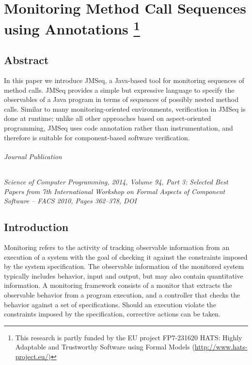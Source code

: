 
\chapter[Monitoring Method Call Sequences using Annotations]{Monitoring Method Call Sequences using Annotations%
\footnote{This research is partly funded by the EU project FP7-231620 HATS: Highly Adaptable and Trustworthy Software using Formal Models (\url{http://www.hats-project.eu/})}
}
% 
\label{ch:p03:ch02}
% 
% 

\section*{Abstract}
In this paper we introduce JMSeq, a Java-based tool for 
monitoring  sequences of
method calls. JMSeq provides a simple but expressive language
to specify the observables of  a Java program in terms of sequences of possibly nested method calls. 
Similar to many
monitoring-oriented environments, verification in JMSeq is done
at runtime; unlike all other approaches based on
aspect-oriented programming, JMSeq uses code
annotation rather than instrumentation,
and therefore is suitable for component-based software verification.

\subparagraph*{Journal Publication}
\emph{Science of Computer Programming, 2014, Volume 94, Part 3: Selected Best Papers from 7th International Workshop on Formal Aspects of Component Software -- FACS 2010, Pages 362--378, DOI }


 \section{Introduction} \label{ch05:sec:intro}
Monitoring refers to the activity of tracking observable information from an
execution of a system with the goal of checking it against the constraints imposed
by the system specification. The observable information of the monitored system
typically includes behavior, input and output, but may also contain quantitative
information. A monitoring framework consists of a monitor that extracts the
observable behavior from a program execution, and a controller that checks the
behavior against a set of specifications. Should an execution
violate the constraints imposed by the specification, corrective
actions can be taken.

